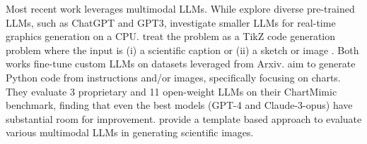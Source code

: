 Most recent work leverages multimodal LLMs. 
While \citet{10121440} explore diverse pre-trained LLMs, such as ChatGPT and GPT3, %
\citet{voigt2024plots} investigate smaller LLMs for real-time graphics generation on a CPU. 
\citet{belouadi2024automatikz,belouadi2024detikzify} %
treat the problem as a TikZ code generation problem where the input is (i) a scientific caption \cite{belouadi2024automatikz} or (ii) a sketch or image \cite{belouadi2024detikzify}. Both works fine-tune custom LLMs on datasets leveraged from Arxiv. %
\citet{shi2024chartmimicevaluatinglmmscrossmodal} %
aim to generate %
Python code %
from instructions and/or images, specifically focusing on charts. %
They evaluate 3 proprietary and 11 open-weight LLMs on their ChartMimic benchmark, finding that even the best models (GPT-4 and Claude-3-opus) have substantial room for improvement. 
\citet{zhang2024scimagegoodmultimodallarge} provide a template based approach to evaluate various multimodal LLMs in generating scientific images. %
